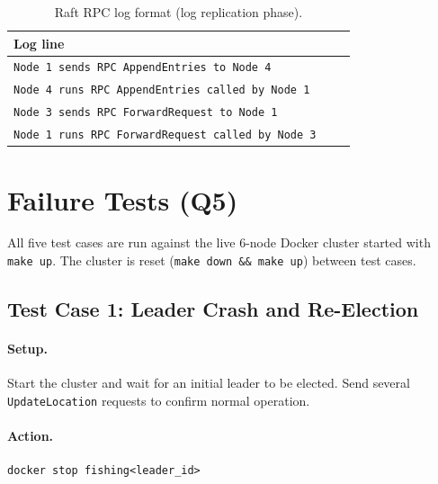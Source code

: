 \documentclass[11pt]{article}
\newcommand{\rpc}[1]{\texttt{#1}}
\begin{document}
\begin{table}[H]
\centering
\caption{Raft RPC log format (log replication phase).}
\label{tab:raft-log-replication}
\begin{tabular}{p{0.92\linewidth}}
\toprule
\textbf{Log line} \\
\midrule
\lstinline|Node 1 sends RPC AppendEntries to Node 4| \\
\lstinline|Node 4 runs RPC AppendEntries called by Node 1| \\
\lstinline|Node 3 sends RPC ForwardRequest to Node 1| \\
\lstinline|Node 1 runs RPC ForwardRequest called by Node 3| \\
\bottomrule
\end{tabular}
\end{table}

\section{Failure Tests (Q5)}

All five test cases are run against the live 6-node Docker cluster started with
\texttt{make up}.  The cluster is reset (\texttt{make down \&\& make up}) between test cases.

\subsection{Test Case 1: Leader Crash and Re-Election}

\paragraph{Setup.}
Start the cluster and wait for an initial leader to be elected.
Send several \rpc{UpdateLocation} requests to confirm normal operation.

\paragraph{Action.}
\begin{lstlisting}[caption={TC1: kill the leader container.}]
docker stop fishing<leader_id>
\end{lstlisting}
\end{document}
